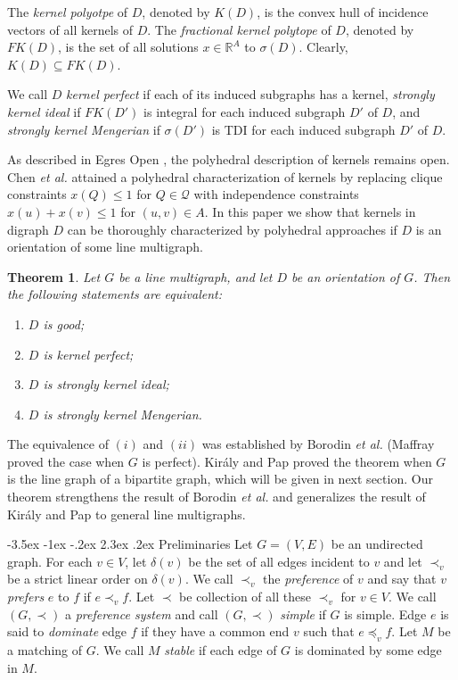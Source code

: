 \documentclass[11pt]{article}
\makeatletter
\newtheorem{theorem}{Theorem}%
\numberwithin{theorem}{section}
\renewcommand\section{%
  \@startsection{section}{1}
                {\z@}%
                {-3.5ex \@plus -1ex \@minus -.2ex}%
                {2.3ex \@plus.2ex}%
                {\large\bfseries}%
}
\makeatother
\begin{document}
The \textit{kernel polyotpe} of $D$, denoted by $K(D)$, is the convex hull of incidence vectors of all kernels of $D$.  The \textit{fractional kernel polytope} of $D$, denoted by $FK(D)$, is the set of all solutions $x\in \mathbb{R}^A$ to $\sigma(D)$. Clearly, $K(D)\subseteq FK(D)$.

We call $D$ \textit{kernel perfect} if each of its induced subgraphs has a kernel, \textit{strongly kernel ideal} if $FK(D')$ is integral for each induced subgraph $D'$ of $D$, and \textit{strongly kernel Mengerian} if $\sigma(D')$ is TDI for each induced subgraph $D'$ of $D$.

As described in Egres Open \cite{Egres}, the polyhedral description of kernels remains open. Chen \textit{et al.} \cite{ChenChen16} attained a polyhedral characterization of kernels by replacing clique constraints $x(Q)\leq 1$ for $Q\in\mathcal{Q}$ with independence constraints $x(u)+x(v)\leq 1$ for $(u,v)\in A$. In this paper we show that kernels in digraph $D$ can be thoroughly characterized by polyhedral approaches if $D$ is an orientation of some line multigraph.

\begin{theorem}
\label{thm:main}
Let $G$ be a line multigraph, and let $D$ be an orientation of $G$. Then the following statements are equivalent:
\begin{enumerate}[label={\emph{(}\roman*\emph{)}}]
	\item $D$ is good;
	\item $D$ is kernel perfect;
	\item $D$ is strongly kernel ideal;
	\item $D$ is strongly kernel Mengerian.
\end{enumerate}
\end{theorem}

The equivalence of $(i)$ and $(ii)$ was established by Borodin \textit{et al.} \cite{BoroKost98} (Maffray \cite{Maff92} proved the case when $G$ is perfect). Kir\'{a}ly and Pap \cite{KiraPap08} proved the theorem when $G$ is the line graph of a bipartite graph, which will be given in next section.
Our theorem strengthens the result of Borodin \textit{et al.} and generalizes the result of Kir\'{a}ly and Pap to general line multigraphs.


\section{Preliminaries}
\label{pre}
Let $G=(V,E)$ be an undirected graph. For each $v\in V$, let $\delta(v)$ be the set of all edges incident to $v$ and let $\prec_v$ be a strict linear order on $\delta(v)$. We call $\prec_v$ the \emph{preference} of $v$ and say that $v$ \emph{prefers} $e$ to $f$ if $e\prec_v f$. Let $\prec$ be collection of all these $\prec_v$ for $v\in V$. We call $(G,\prec)$ a \emph{preference system} and call $(G,\prec)$ \emph{simple} if $G$ is simple. Edge $e$ is said to \emph{dominate} edge $f$ if they have a common end $v$ such that $e\preceq_v f$. Let $M$ be a matching of $G$. We call $M$ \emph{stable} if each edge of $G$ is dominated by some edge in $M$.
\end{document}

